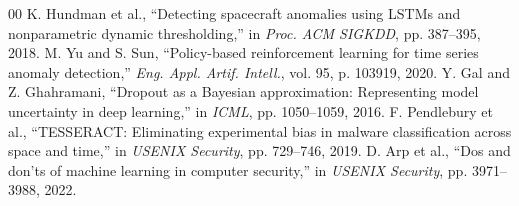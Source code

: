 \documentclass[conference]{IEEEtran}
\begin{document}
\begin{thebibliography}{00}
 K. Hundman et al., ``Detecting spacecraft anomalies using LSTMs and nonparametric dynamic thresholding,'' in \textit{Proc. ACM SIGKDD}, pp. 387--395, 2018.
 M. Yu and S. Sun, ``Policy-based reinforcement learning for time series anomaly detection,'' \textit{Eng. Appl. Artif. Intell.}, vol. 95, p. 103919, 2020.
 Y. Gal and Z. Ghahramani, ``Dropout as a Bayesian approximation: Representing model uncertainty in deep learning,'' in \textit{ICML}, pp. 1050--1059, 2016.
 F. Pendlebury et al., ``TESSERACT: Eliminating experimental bias in malware classification across space and time,'' in \textit{USENIX Security}, pp. 729--746, 2019.
 D. Arp et al., ``Dos and don'ts of machine learning in computer security,'' in \textit{USENIX Security}, pp. 3971--3988, 2022.
\end{thebibliography}
\end{document}

